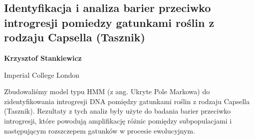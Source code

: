 \documentclass[\main/boa.tex]{subfiles}
\begin{document}
\subsection{Identyfikacja i analiza barier przeciwko introgresji pomiedzy gatunkami roślin z rodzaju Capsella (Tasznik)}

\begin{minipage}{0.915\textwidth}
	\centering
  {\bf {} Krzysztof Stankiewicz}
\end{minipage}

\begin{affiliations}
\begin{minipage}{0.915\textwidth}
\centering
Imperial College London \\[-2pt]
\end{minipage}
\end{affiliations}

\vskip 0.3cm
Zbudowaliśmy model typu HMM (z ang. Ukryte Pole Markowa) do zidentyfikowania introgresji DNA pomiędzy gatunkami roślin z rodzaju Capsella (Tasznik). Rezultaty z tych analiz były użyte do badania barier przeciwko introgresji, które powodują amplifikację różnic pomiędzy subpopulacjami i następującym rozszczepem gatunków w procesie ewolucyjnym.
\end{document}
